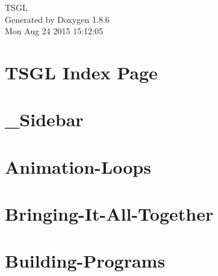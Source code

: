 \documentclass[twoside]{book}
\newcommand{\clearemptydoublepage}{%
  \newpage{\pagestyle{empty}\cleardoublepage}%
}
\begin{document}
\hypersetup{pageanchor=false}
\begin{titlepage}
\vspace*{7cm}
\begin{center}%
{\Large T\-S\-G\-L }\\
\vspace*{1cm}
{\large Generated by Doxygen 1.8.6}\\
\vspace*{0.5cm}
{\small Mon Aug 24 2015 15:12:05}\\
\end{center}
\end{titlepage}
\clearemptydoublepage
\tableofcontents
\clearemptydoublepage
{}
\hypersetup{pageanchor=true}

\chapter{T\-S\-G\-L Index Page}
\label{index}\hypertarget{index}{}
\chapter{\-\_\-\-Sidebar}
\label{md__home_cpd5_workspace__t_s_g_l_docs-wiki___sidebar}
\hypertarget{md__home_cpd5_workspace__t_s_g_l_docs-wiki___sidebar}{}

\chapter{Animation-\/\-Loops}
\label{md__home_cpd5_workspace__t_s_g_l_docs-wiki__animation-_loops}
\hypertarget{md__home_cpd5_workspace__t_s_g_l_docs-wiki__animation-_loops}{}

\chapter{Bringing-\/\-It-\/\-All-\/\-Together}
\label{md__home_cpd5_workspace__t_s_g_l_docs-wiki__bringing-_it-_all-_together}
\hypertarget{md__home_cpd5_workspace__t_s_g_l_docs-wiki__bringing-_it-_all-_together}{}

\chapter{Building-\/\-Programs}
\label{md__home_cpd5_workspace__t_s_g_l_docs-wiki__building-_programs}
\hypertarget{md__home_cpd5_workspace__t_s_g_l_docs-wiki__building-_programs}{}

\end{document}

